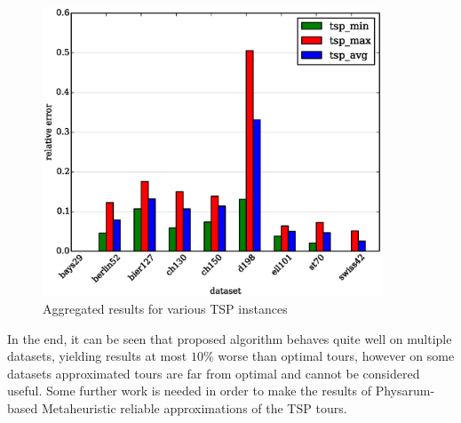 \documentclass[english,a4paper,twoside]{ppfcmthesis}
\begin{document}
\begin{figure}
  \centering

  \includegraphics[width=0.9\textwidth]{algorithm/metaheuristic/charts/tsp/final/distance.eps}

  \caption{Aggregated results for various TSP instances}
  \label{figure:tsp_final}
\end{figure}

In the end, it can be seen that proposed algorithm behaves quite well on multiple datasets, yielding results at most $10\%$ worse than optimal tours, however on some datasets approximated tours are far from optimal and cannot be considered useful. Some further work is needed in order to make the results of Physarum-based Metaheuristic reliable approximations of the TSP tours.

{\raggedright\sloppy\small}

\cleardoublepage\ppcolophon
\end{document}
